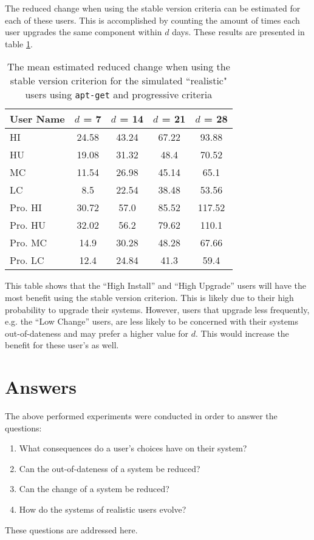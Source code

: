 The reduced change when using the stable version criteria can be estimated for each of these users.
This is accomplished by counting the amount of times each user upgrades the same component within $d$ days.
These results are presented in table \ref{exp.tblq6sv}.
\begin{table}[h!]
\centering
\begin{tabular}{|l | c | c | c | c |}
\hline
User Name 	& $d$ = 7 	&  $d$ = 14 	&	$d$ = 21 	&	$d$ = 28 	\\ \hline
HI 			&24.58 	&	43.24&	 67.22&	 93.88\\
HU 			&19.08 	&	31.32&	 48.4&	 70.52\\
MC 			&11.54 	&	26.98&	 45.14&	 65.1\\
LC 			&8.5 	&	22.54&	 38.48&	 53.56\\
Pro. HI 	&30.72 	&	57.0&	 85.52&	 117.52\\
Pro. HU 	&32.02 	&	56.2&	 79.62&	 110.1\\
Pro. MC 	&14.9 	&	30.28&	 48.28&	 67.66\\
Pro. LC 	&12.4 	&	24.84&	 41.3&	 59.4\\ \hline
\end{tabular}
\caption{The mean estimated reduced change when using the stable version criterion for the simulated ``realistic" users using \texttt{apt-get} and progressive criteria}
\label{exp.tblq6sv}
\end{table}

This table shows that the ``High Install'' and ``High Upgrade'' users will have the most benefit using the stable version criterion.
This is likely due to their high probability to upgrade their systems.
However, users that upgrade less frequently, e.g. the ``Low Change'' users, are less likely to be concerned with their systems out-of-dateness and may prefer a higher value for $d$.
This would increase the benefit for these user's as well.

\section{Answers}
The above performed experiments were conducted in order to answer the questions:
\begin{enumerate}
  \item What consequences do a user's choices have on their system?
  \item Can the out-of-dateness of a system be reduced?
  \item Can the change of a system be reduced?
  \item How do the systems of realistic users evolve?
\end{enumerate}
These questions are addressed here.

